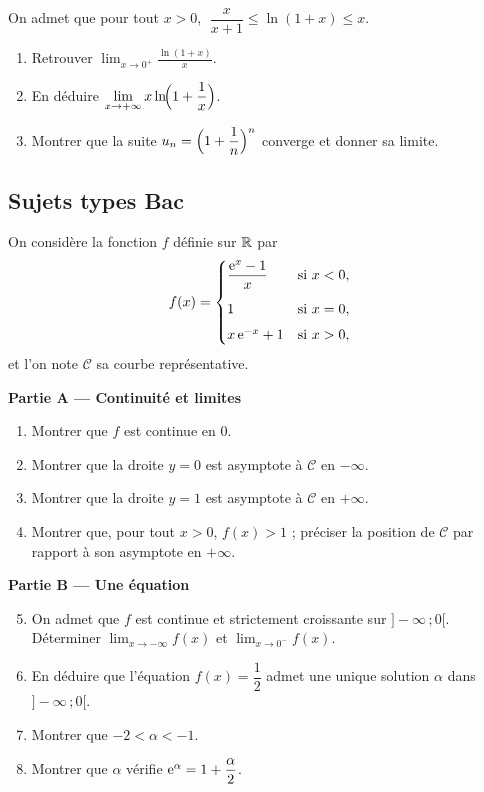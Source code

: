 On admet que pour tout $x>0$, $\;\dfrac{x}{x+1}\leq\ln(1+x)\leq x$.
\begin{enumerate}
	\item Retrouver $\displaystyle\lim_{x\to 0^+}\frac{\ln(1+x)}{x}$.
	\item En déduire $\displaystyle\lim_{x\to+\infty}x\ln\!\Bigl(1+\frac{1}{x}\Bigr)$.
	\item Montrer que la suite $u_n=\Bigl(1+\dfrac{1}{n}\Bigr)^{n}$ converge et
	donner sa limite.
\end{enumerate}

\subsection{Sujets types Bac}

On considère la fonction $f$ définie sur $\mathbb{R}$ par
\[
f(x)=
\begin{cases}
	\dfrac{\mathrm{e}^{x}-1}{x} & \text{si } x<0,\\[1em]
	1 & \text{si } x=0,\\[0.4em]
	x\,\mathrm{e}^{-x}+1 & \text{si } x>0,
\end{cases}
\]
et l'on note $\mathcal C$ sa courbe représentative.

\textbf{Partie A — Continuité et limites}
\begin{enumerate}
	\item Montrer que $f$ est continue en $0$.
	\item Montrer que la droite $y=0$ est asymptote à $\mathcal C$ en $-\infty$.
	\item Montrer que la droite $y=1$ est asymptote à $\mathcal C$ en $+\infty$.
	\item Montrer que, pour tout $x>0$, $f(x)>1$ ; préciser la position de
	$\mathcal C$ par rapport à son asymptote en $+\infty$.
\end{enumerate}

\textbf{Partie B — Une équation}
\begin{enumerate}
	\setcounter{enumi}{4}
	\item On admet que $f$ est continue et strictement croissante sur
	$]-\infty\,;0[$. Déterminer $\displaystyle\lim_{x\to-\infty}f(x)$ et
	$\displaystyle\lim_{x\to 0^-}f(x)$.
	\item En déduire que l'équation $f(x)=\dfrac{1}{2}$ admet une unique solution
	$\alpha$ dans $]-\infty\,;0[$.
	\item Montrer que $-2<\alpha<-1$.
	\item Montrer que $\alpha$ vérifie $\mathrm{e}^{\alpha}=1+\dfrac{\alpha}{2}$.
\end{enumerate}


